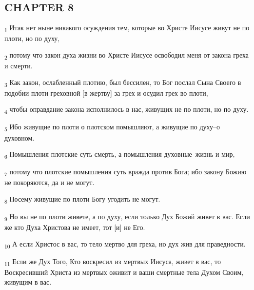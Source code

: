 \subsection{CHAPTER 8}
\begin{tcolorbox}
\textsubscript{1} Итак нет ныне никакого осуждения тем, которые во Христе Иисусе живут не по плоти, но по духу,
\end{tcolorbox}
\begin{tcolorbox}
\textsubscript{2} потому что закон духа жизни во Христе Иисусе освободил меня от закона греха и смерти.
\end{tcolorbox}
\begin{tcolorbox}
\textsubscript{3} Как закон, ослабленный плотию, был бессилен, то Бог послал Сына Своего в подобии плоти греховной [в жертву] за грех и осудил грех во плоти,
\end{tcolorbox}
\begin{tcolorbox}
\textsubscript{4} чтобы оправдание закона исполнилось в нас, живущих не по плоти, но по духу.
\end{tcolorbox}
\begin{tcolorbox}
\textsubscript{5} Ибо живущие по плоти о плотском помышляют, а живущие по духу--о духовном.
\end{tcolorbox}
\begin{tcolorbox}
\textsubscript{6} Помышления плотские суть смерть, а помышления духовные--жизнь и мир,
\end{tcolorbox}
\begin{tcolorbox}
\textsubscript{7} потому что плотские помышления суть вражда против Бога; ибо закону Божию не покоряются, да и не могут.
\end{tcolorbox}
\begin{tcolorbox}
\textsubscript{8} Посему живущие по плоти Богу угодить не могут.
\end{tcolorbox}
\begin{tcolorbox}
\textsubscript{9} Но вы не по плоти живете, а по духу, если только Дух Божий живет в вас. Если же кто Духа Христова не имеет, тот [и] не Его.
\end{tcolorbox}
\begin{tcolorbox}
\textsubscript{10} А если Христос в вас, то тело мертво для греха, но дух жив для праведности.
\end{tcolorbox}
\begin{tcolorbox}
\textsubscript{11} Если же Дух Того, Кто воскресил из мертвых Иисуса, живет в вас, то Воскресивший Христа из мертвых оживит и ваши смертные тела Духом Своим, живущим в вас.
\end{tcolorbox}
